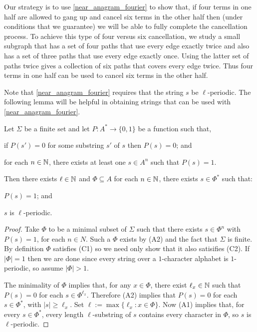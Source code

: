 \documentclass{patmorin}
\begin{document}
Our strategy is to use \cref{near_anagram_fourier} to show that, if four terms in one half are allowed to gang up and cancel six terms in the other half then (under conditions that we guarantee) we will be able to fully complete the cancellation process.  To achieve this type of four versus six cancellation, we study a small subgraph that has a set of four paths that use every edge exactly twice and also has a set of three paths that use every edge exactly once.  Using the latter set of paths twice gives a collection of six paths that covers every edge twice.  Thus four terms in one half can be used to cancel six terms in the other half.

Note that \cref{near_anagram_fourier} requires that the string $s$ be $\ell$-periodic.  The following lemma will be helpful in obtaining strings that can be used with \cref{near_anagram_fourier}.

\begin{lem}\label{periodicity}
    Let $\Sigma$ be a finite set and let $P:A^*\to\{0,1\}$ be a function such that,
    \begin{compactenum}[({A}1)]
        \item if $P(s')=0$ for some substring $s'$ of $s$ then $P(s)=0$; and
        \item for each $n\in\mathbb{N}$, there exists at least one $s\in A^n$ such that $P(s)=1$.
    \end{compactenum}
    Then there exists $\ell\in\mathbb{N}$ and $\Phi\subseteq A$ for each $n\in\mathbb{N}$, there exists $s\in \Phi^*$ such that:
    \begin{compactenum}[(C1)]
        \item $P(s)=1$; and
        \item $s$ is $\ell$-periodic.
    \end{compactenum}
\end{lem}

\begin{proof}
    Take $\Phi$ to be a minimal subset of $\Sigma$ such that there exists $s\in\Phi^n$ with $P(s)=1$, for each $n\in N$.  Such a $\Phi$ exists by (A2) and the fact that $\Sigma$ is finite. By definition $\Phi$ satisfies (C1) so we need only show that it also satisifies (C2).  If $|\Phi|=1$ then we are done since every string over a $1$-character alphabet is $1$-periodic, so assume $|\Phi|>1$.

    The minimality of $\Phi$ implies that, for any $x\in\Phi$, there exist $\ell_x\in\mathbb{N}$ such that $P(s)=0$ for each $s\in\Phi^{\ell_x}$.  Therefore (A2) implies that $P(s)=0$ for each $s\in\Phi^*$, with $|s|\ge \ell_x$.  Set $\ell:=\max\{\ell_x:x\in \Phi\}$.  Now (A1) implies that, for every $s\in\Phi^*$, every length $\ell$-substring of $s$ contains every character in $\Phi$, so $s$ is $\ell$-periodic.
\end{proof}
\end{document}
